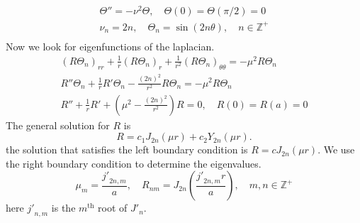{\begin{Solution}
\begin{enumerate}
\begin{gather*}
      \Theta'' = - \nu^2 \Theta, \quad \Theta(0) = \Theta(\pi/2) = 0 \\
      \nu_n = 2 n, \quad \Theta_n = \sin(2 n \theta), \quad n \in \mathbb{Z}^+ \\
    \end{gather*}
    Now we look for eigenfunctions of the laplacian.
    \begin{gather*}
      (R \Theta_n)_{r r} + \frac{1}{r} (R \Theta_n)_r 
      + \frac{1}{r^2} (R \Theta_n)_{\theta \theta} 
      = - \mu^2 R \Theta_n \\
      R'' \Theta_n + \frac{1}{r} R' \Theta_n 
      - \frac{(2 n)^2}{r^2} R \Theta_n = - \mu^2 R \Theta_n \\
      R'' + \frac{1}{r} R' + \left( \mu^2 - \frac{(2 n)^2}{r^2} \right) R = 0,
      \quad R(0) = R(a) = 0
    \end{gather*}
    The general solution for $R$ is
    \[
    R = c_1 J_{2 n}(\mu r) + c_2 Y_{2 n}(\mu r).
    \]
    the solution that satisfies the left boundary condition is
    $R = c J_{2 n}(\mu r)$.  We use the right boundary condition to 
    determine the eigenvalues.
    \[
    \mu_m = \frac{{j'}_{2n,m}}{a}, \quad
    R_{n m} = J_{2 n} \left( \frac{{j'}_{2n,m} r}{a} \right), \quad
    m,n \in \mathbb{Z}^+
    \]
    here ${j'}_{n,m}$ is the $m^{\mathrm{th}}$ root of ${J'}_n$.


\end{enumerate}
\end{Solution}}
